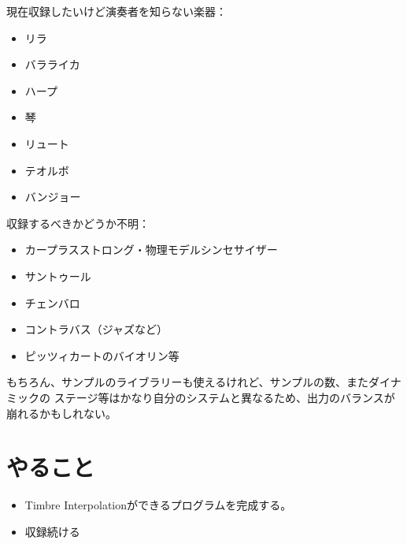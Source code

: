 \documentclass[a4paper, 12pt]{article}
\begin{document}
現在収録したいけど演奏者を知らない楽器：
\begin{itemize}
    \item リラ
    \item バラライカ
    \item ハープ
    \item 琴
    \item リュート
    \item テオルボ
    \item バンジョー\\
\end{itemize}

収録するべきかどうか不明：
\begin{itemize}
    \item カープラスストロング・物理モデルシンセサイザー
    \item サントゥール
    \item チェンバロ
    \item コントラバス（ジャズなど）
    \item ピッツィカートのバイオリン等\\
\end{itemize}
もちろん、サンプルのライブラリーも使えるけれど、サンプルの数、またダイナミックの
ステージ等はかなり自分のシステムと異なるため、出力のバランスが崩れるかもしれない。

\section*{やること}
\begin{itemize}
    \item Timbre Interpolationができるプログラムを完成する。
    \item 収録続ける
\end{itemize}



\end{document}
